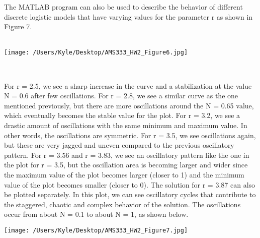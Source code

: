 \documentclass[12pt]{article}
\begin{document}
The MATLAB program can also be used to describe the behavior of different discrete logistic models that have varying values for the parameter r as shown in Figure 7. \\\


\begin{center}
   \texttt{[image: /Users/Kyle/Desktop/AMS333\_HW2\_Figure6.jpg]}
\end{center}\

For r = 2.5, we see a sharp increase in the curve and a stabilization at the value N = 0.6 after few oscillations. For r = 2.8, we see a similar curve as the one mentioned previously, but there are more oscillations around the N = 0.65 value, which eventually becomes the stable value for the plot. For r = 3.2, we see a drastic amount of oscillations with the same minimum and maximum value. In other words, the oscillations are symmetric. For r = 3.5, we see oscillations again, but these are very jagged and uneven compared to the previous oscillatory pattern. For r = 3.56 and r = 3.83, we see an oscillatory pattern like the one in the plot for r = 3.5, but the oscillation area is becoming larger and wider since the maximum value of the plot becomes larger (closer to 1) and the minimum value of the plot becomes smaller (closer to 0). The solution for r = 3.87 can also be plotted separately. In this plot, we can see oscillatory cycles that contribute to the staggered, chaotic and complex behavior of the solution. The oscillations occur from about N = 0.1 to about N = 1, as shown below.


\begin{center}
   \texttt{[image: /Users/Kyle/Desktop/AMS333\_HW2\_Figure7.jpg]}
\end{center} 
\end{document}
